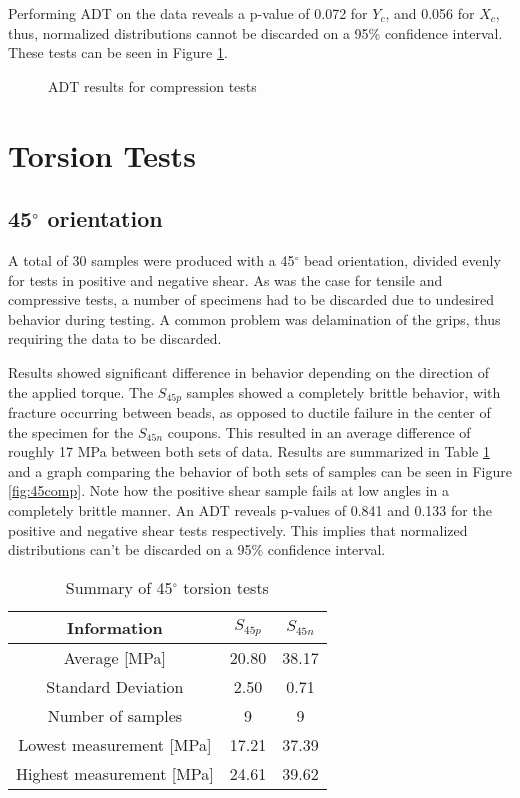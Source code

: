 \documentclass[main.tex]{subfiles}
\begin{document}
Performing ADT on the data reveals a p-value of 0.072 for $Y_c$, and 0.056 for $X_c$, thus, normalized distributions cannot be discarded on a 95\% confidence interval. These tests can be seen in Figure \ref{fig:adtcomp}.

\begin{figure}[!htbp]
	\center
	\hfill
	\caption{ADT results for compression tests} \label{fig:adtcomp}
\end{figure}

\newpage
\section{Torsion Tests} \label{sec:torsr}
\subsection{45$^\circ$ orientation} \label{ssec:45r}
A total of 30 samples were produced with a 45$^\circ$ bead orientation, divided evenly for tests in positive and negative shear. As was the case for tensile and compressive tests, a number of specimens had to be discarded due to undesired behavior during testing. A common problem was delamination of the grips, thus requiring the data to be discarded. 

Results showed significant difference in behavior depending on the direction of the applied torque. The $S_{45p}$ samples showed a completely brittle behavior, with fracture occurring between beads, as opposed to ductile failure in the center of the specimen for the $S_{45n}$ coupons. This resulted in an average difference of roughly 17 MPa between both sets of data. Results are summarized in Table \ref{tab:tors45r} and a graph comparing the behavior of both sets of samples can be seen in Figure \ref{fig:45comp}. Note how the positive shear sample fails at low angles in a completely brittle manner. An ADT reveals p-values of 0.841 and 0.133 for the positive and negative shear tests respectively. This implies that normalized distributions can't be discarded on a 95\% confidence interval. 

\begin{table} [h]
	\centering
	\caption{Summary of 45$^\circ$ torsion tests}
\begin{tabular}{ c| c c } 
	\toprule
	\textbf{Information} & $S_{45p}$ & $S_{45n}$\\
	\midrule
	Average [MPa] & 20.80 & 38.17\\
	Standard Deviation & 2.50 & 0.71\\
	Number of samples & 9 & 9\\
	Lowest measurement [MPa] &17.21  & 37.39\\
	Highest measurement [MPa] &24.61 & 39.62\\
	\bottomrule
\end{tabular}
\label{tab:tors45r}
\end{table}
\end{document}
